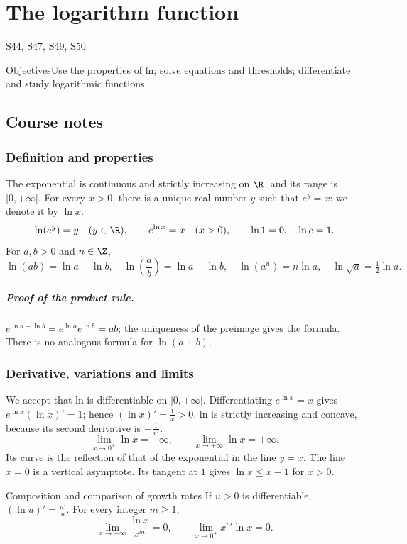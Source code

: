 \setcounter{chapter}{5}\chapter{The logarithm function}\label{ch:6}

{\small\sffamily\color{teal}S44, S47, S49, S50\par}

\begin{retenir}{Objectives}Use the properties of ln; solve equations and thresholds; differentiate and study logarithmic functions.\end{retenir}

\section{Course notes}
\subsection{Definition and properties}
The exponential is continuous and strictly increasing on $\R$, and its range is $]0,+\infty[$. For every $x>0$, there is a unique real number $y$ such that $e^y=x$: we denote it by $\ln x$.
\[\ln(e^y)=y\quad(y\in\R),\qquad e^{\ln x}=x\quad(x>0),\qquad\ln1=0,\quad\ln e=1.\]
For $a,b>0$ and $n\in\Z$,
\[\ln (ab)=\ln a+\ln b,\quad\ln (\frac{a}{b})=\ln a-\ln b,\quad\ln (a^n)=n\ln a,\quad\ln \sqrt{a}=\tfrac{1}{2}\ln a.\]
\paragraph{Proof of the product rule.} $e^{\ln a+\ln b}=e^{\ln a}e^{\ln b}=ab$; the uniqueness of the preimage gives the formula. There is no analogous formula for $\ln(a+b)$.
\subsection{Derivative, variations and limits}
We accept that ln is differentiable on $]0,+\infty[$. Differentiating $e^{\ln x}=x$ gives $e^{\ln x}(\ln x)'=1$; hence $(\ln x)'=\frac{1}{x}>0$. ln is strictly increasing and concave, because its second derivative is $-\frac{1}{x^2}$.
\[\lim_{x\to0^+}\ln x=-\infty,\qquad\lim_{x\to+\infty}\ln x=+\infty.\]
Its curve is the reflection of that of the exponential in the line $y=x$. The line $x=0$ is a vertical asymptote. Its tangent at $1$ gives $\ln x\le x-1$ for $x>0$.
\begin{retenir}{Composition and comparison of growth rates}
If $u>0$ is differentiable, $(\ln u)'=\frac{u'}{u}$. For every integer $m\ge1$,
\[\lim_{x\to+\infty}\frac{\ln x}{x^m}=0,\qquad\lim_{x\to0^+}x^m\ln x=0.\]
\end{retenir}
